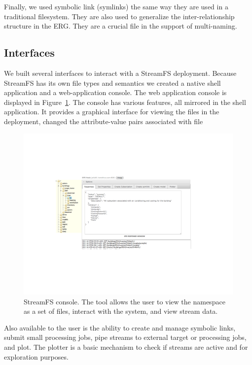 Finally, we used symbolic link (symlinks) the same way they are used in a traditional filesystem.  They are also used to generalize
the inter-relationship structure in the ERG.  They are a crucial file in the support of multi-naming.

\subsection{Interfaces}
We built several interfaces to interact with a StreamFS deployment.  Because StreamFS has its own file types and semantics
we created a native shell application and a web-application console.  The web application console is displayed in 
Figure~\ref{fig:sfsconsole}.  The console has various features, all mirrored in the shell application.  It provides
a graphical interface for viewing the files in the deployment, changed the attribute-value pairs associated with file

\begin{figure}[htb!]
\begin{center}
\includegraphics[scale=0.6]{figs/sfs_console}
\caption{StreamFS console.  The tool allows the user to view the namespace as a set of files, interact with the system, and 
view stream data.}
\label{fig:sfsconsole}
\end{center}
\end{figure}

Also available to the user is the ability to create and manage symbolic links, submit small processing jobs, pipe
streams to external target or processing jobs, and plot.  The plotter is a basic mechanism to check if streams are 
active and for exploration purposes.



